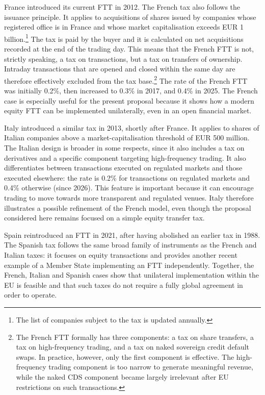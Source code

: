 \documentclass[../../main]{subfiles}
\begin{document}
France introduced its current FTT in 2012. The French tax also follows the issuance principle. It applies to acquisitions of shares issued by companies whose registered office is in France and whose market capitalisation exceeds EUR 1 billion.\footnote{The list of companies subject to the tax is updated annually.} The tax is paid by the buyer and it is calculated on net acquisitions recorded at the end of the trading day. This means that the French FTT is not, strictly speaking, a tax on transactions, but a tax on transfers of ownership. Intraday transactions that are opened and closed within the same day are therefore effectively excluded from the tax base.\footnote{The French FTT formally has three components: a tax on share transfers, a tax on high-frequency trading, and a tax on naked sovereign credit default swaps. In practice, however, only the first component is effective. The high-frequency trading component is too narrow to generate meaningful revenue, while the naked CDS component became largely irrelevant after EU restrictions on such transactions.} The rate of the French FTT was initially 0.2\%, then increased to 0.3\% in 2017, and 0.4\% in 2025. The French case is especially useful for the present proposal because it shows how a modern equity FTT can be implemented unilaterally, even in an open financial market.

Italy introduced a similar tax in 2013, shortly after France. It applies to shares of Italian companies above a market-capitalisation threshold of EUR 500 million. The Italian design is broader in some respects, since it also includes a tax on derivatives and a specific component targeting high-frequency trading. It also differentiates between transactions executed on regulated markets and those executed elsewhere: the rate is 0.2\% for transactions on regulated markets and 0.4\% otherwise (since 2026). This feature is important because it can encourage trading to move towards more transparent and regulated venues. Italy therefore illustrates a possible refinement of the French model, even though the proposal considered here remains focused on a simple equity transfer tax.

Spain reintroduced an FTT in 2021, after having abolished an earlier tax in 1988. The Spanish tax follows the same broad family of instruments as the French and Italian taxes: it focuses on equity transactions and provides another recent example of a Member State implementing an FTT independently. Together, the French, Italian and Spanish cases show that unilateral implementation within the EU is feasible and that such taxes do not require a fully global agreement in order to operate.
\end{document}
